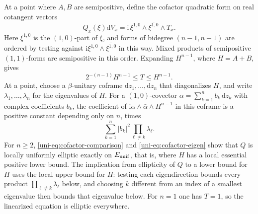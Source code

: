 At a point where $A,B$ are semipositive, define the cofactor quadratic form on real cotangent vectors
\begin{equation}
 Q_x(\xi)\mathrm{d}V_x
   =\mathrm{i}\,\xi^{1,0}\wedge\overline{\xi^{1,0}}\wedge T_x .
 \label{uni-eq:Q}
\end{equation}
Here $\xi^{1,0}$ is the $(1,0)$-part of $\xi$, and forms of bidegree $(n-1,n-1)$ are ordered by testing against $\mathrm i\xi^{1,0}\wedge\overline{\xi^{1,0}}$ in this way. Mixed products of semipositive $(1,1)$-forms are semipositive in this
order. Expanding $H^{n-1}$, where $H=A+B$, gives
\begin{equation}
 2^{-(n-1)}H^{n-1}\leq T\leq H^{n-1}.
 \label{uni-eq:cofactor-comparison}
\end{equation}
At a point, choose a $\beta$-unitary coframe $\mathrm{d}z_1,\ldots,\mathrm{d}z_n$ that diagonalizes $H$, and write $\lambda_1,\ldots,\lambda_n$ for the eigenvalues of $H$. For a $(1,0)$-covector
$\alpha=\sum_{k=1}^n b_k\,\mathrm{d}z_k$ with complex coefficients $b_k$, the coefficient of
$\mathrm{i}\alpha\wedge\bar\alpha\wedge H^{n-1}$ in this coframe is a positive constant depending only on $n$, times
\begin{equation}
  \sum_{k=1}^n |b_k|^2\prod_{\ell\ne k}\lambda_\ell.
 \label{uni-eq:cofactor-eigen}
\end{equation}
For $n\geq2$, \eqref{uni-eq:cofactor-comparison} and \eqref{uni-eq:cofactor-eigen}
show that $Q$ is locally uniformly elliptic exactly on $E_{\rm unif}$, that is, where $H$ has a
local essential positive lower bound.  The implication from ellipticity of $Q$ to a lower bound for $H$ uses the
local upper bound for $H$: testing each eigendirection bounds every product
$\prod_{\ell\ne k}\lambda_\ell$ below, and choosing $k$ different from
an index of a smallest eigenvalue then bounds that eigenvalue below.  For $n=1$
one has $T=1$, so the linearized equation is elliptic everywhere.

